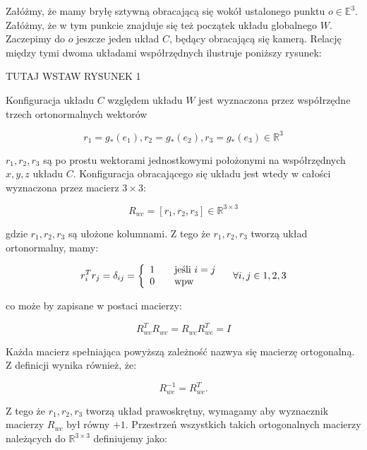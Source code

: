 \documentclass[a4paper,12pt]{article}
\newcommand{\E}{\mathbb{E}}
\newcommand{\RR}{\mathbb{R}^3}
\newcommand{\RRR}{\mathbb{R}^{3 \times 3}}
\begin{document}
Załóżmy, że mamy bryłę sztywną obracającą się wokół ustalonego punktu $o \in \E^3$. Załóżmy, że w tym punkcie znajduje się też początek układu globalnego $W$. Zaczepimy do $o$ jeszcze jeden układ $C$, będący obracającą się kamerą. Relację między tymi dwoma układami współrzędnych ilustruje poniższy rysunek:

TUTAJ WSTAW RYSUNEK 1

Konfiguracja układu $C$ względem układu $W$ jest wyznaczona przez współrzędne trzech ortonormalnych wektorów 

\begin{equation}
r_1=g_*(e_1), r_2=g_*(e_2), r_3=g_*(e_3) \in \RR
\end{equation}

$r_1,r_2,r_3$ są po prostu wektorami jednostkowymi położonymi na współrzędnych $x,y,z$ układu $C$. Konfiguracja obracającego się układu jest wtedy w całości wyznaczona przez macierz $3 \times 3$:

\begin{equation}
R_{wc} = [r_1,r_2,r_3] \in \RRR 
\end{equation}

\noindent gdzie $r_1,r_2,r_3$ są ułożone kolumnami. Z tego że $r_1,r_2,r_3$ tworzą układ ortonormalny, mamy:

\begin{equation}
r^T_ir_j = \delta_{ij} = \left\{
  \begin{array}{l l}
    1 & \quad \text{jeśli $i=j$}\\
    0 & \quad \text{wpw}\\
  \end{array} \right.
  \quad \forall i,j \in {1,2,3}
\end{equation}

\noindent co może by zapisane w postaci macierzy:

\begin{equation}
R_{wc}^TR_{wc} = R_{wc}R_{wc}^T = I
\end{equation}

Każda macierz spełniająca powyższą zależność nazwya się macierzę ortogonalną. Z definicji wynika również, że:

\begin{equation}
R_{wc}^{-1} = R_{wc}^T. 
\end{equation}

Z tego że $r_1,r_2,r_3$ tworzą układ prawoskrętny, wymagamy aby wyznacznik macierzy $R_{wc}$ był równy $+1$. Przestrzeń wszystkich takich ortogonalnych macierzy należących do $\RRR$ definiujemy jako:
\end{document}
